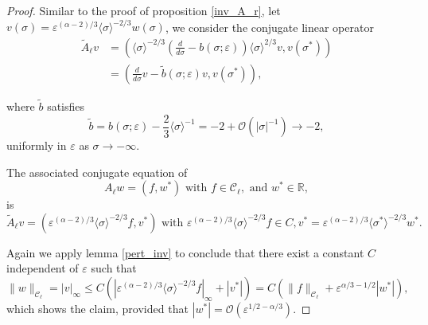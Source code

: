 \documentclass[letterpaper,11pt]{article}
\newcommand{\rmO}{\mathcal{O}}
\newcommand{\eps}{\varepsilon}
\numberwithin{equation}{section}
\theoremstyle{plain}
\begin{document}
\begin{proof}
Similar to the proof of proposition \ref{inv_A_r}, let $v(\sigma) =\eps^{(\alpha-2)/3} \langle\sigma \rangle^{-2/3}w(\sigma)$, we consider the conjugate linear operator
\begin{align*}
\tilde{A}_\ell v &= \left( \langle \sigma\rangle^{-2/3}\left(\frac{d}{d\sigma}-b(\sigma;\eps)\right)\langle \sigma\rangle^{2/3} v, v(\sigma^*) \right) \\
&= \left( \frac{d}{d\sigma}v -\tilde{b}(\sigma;\eps)v, v(\sigma^*) \right),
\end{align*}

where $\tilde{b}$ satisfies 
\[
\tilde{b} = b(\sigma;\eps)-\frac{2}{3}\langle \sigma\rangle^{-1} =-2 + \rmO(|\sigma|^{-1}) \to -2,
\]
uniformly in $\eps$ as $\sigma \to -\infty$.

The associated conjugate equation of 
\[
A_\ell w = (f,w^*) \text{ with } f \in \mathcal{C}_\ell, \text{ and }w^* \in \mathbb{R} , 
\] is 
\[
\tilde{A}_\ell v = (\eps^{(\alpha-2)/3}\langle \sigma \rangle^{-2/3} f,v^*) \text{ with } \eps^{(\alpha-2)/3}\langle \sigma \rangle^{-2/3} f \in C, v^* = \eps^{(\alpha-2)/3}\langle \sigma^* \rangle^{-2/3} w^*.
\]

Again we apply lemma \ref{pert_inv} to conclude that there exist a constant $C$ independent of $\eps$ such that
\[
\|w\|_{\mathcal{C}_\ell} = |v|_\infty \le C(|\eps^{(\alpha-2)/3}\langle \sigma \rangle^{-2/3} f |_{\infty}+| v^*|) = C(\|f\|_{\mathcal{C}_\ell}+\eps^{\alpha/3-1/2}|w^*|),
\]
which shows the claim, provided that $|w^*| = \rmO(\eps^{1/2-\alpha/3})$.
\end{proof}
\end{document}
